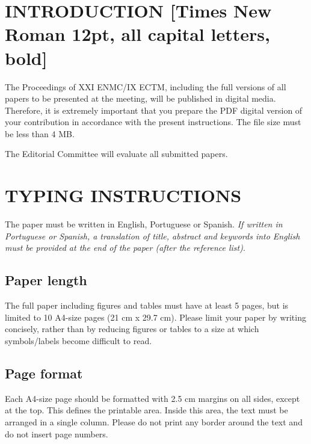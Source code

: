 \documentclass[12pt,fleqn]{article}
\renewcommand{\headrulewidth}{0.0pt}
\begin{document}

\renewcommand{\headrulewidth}{0.0pt}
\rhead{}


\pagestyle{fancy}


\section{INTRODUCTION [Times New Roman 12pt, all capital letters, bold]}
The Proceedings of XXI ENMC/IX ECTM, including the full versions of all papers to be presented at the meeting, will be published in digital media. Therefore, it is extremely important that you prepare the PDF digital version of your contribution in accordance with the present instructions. The file size must be less than 4 MB.

The Editorial Committee will evaluate all submitted papers.

\section{TYPING INSTRUCTIONS}
The paper must be written in English, Portuguese or Spanish. {\it If written in Portuguese or Spanish, a translation of title, abstract and keywords into English must be provided at the end of the paper (after the reference list)}.


\subsection{Paper length}
The full paper including figures and tables must have at least 5 pages, but is limited to 10 A4-size pages (21 cm x 29.7 cm). Please limit your paper by writing concisely, rather than by reducing figures or tables to a size at which symbols/labels become difficult to read.

\subsection{Page format}
Each A4-size page should be formatted with 2.5 cm margins on all sides, except at the top. This defines the printable area. Inside this area, the text must be arranged in a single column. Please do not print any border around the text and do not insert page numbers.
\end{document}
